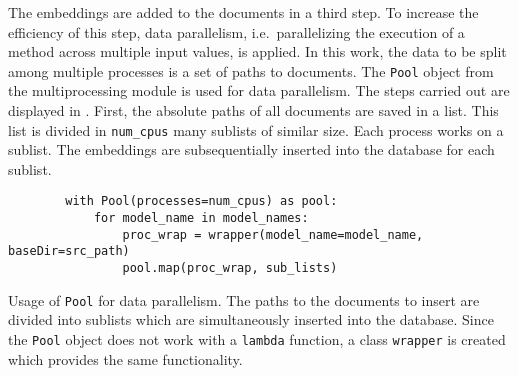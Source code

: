 
The embeddings are added to the documents in a third step.
To increase the efficiency of this step, data parallelism, i.e.\ parallelizing the execution of a method across multiple input values, is applied.
In this work, the data to be split among multiple processes is a set of paths to documents.
The \texttt{Pool} object from the multiprocessing module is used for data parallelism.
The steps carried out are displayed in .
First, the absolute paths of all documents are saved in a list.
This list is divided in \texttt{num\_cpus} many sublists of similar size.
Each process works on a sublist.
The embeddings are subsequentially inserted into the database for each sublist. 

\begin{listing}[htp]
    \begin{verbatim}
        with Pool(processes=num_cpus) as pool:
            for model_name in model_names:
                proc_wrap = wrapper(model_name=model_name, baseDir=src_path)
                pool.map(proc_wrap, sub_lists)
    \end{verbatim}
    \caption[Usage of \texttt{Pool} for data parallelism]
    {Usage of \texttt{Pool} for data parallelism.
    The paths to the documents to insert are divided into sublists which are simultaneously inserted into the database.
    Since the \texttt{Pool} object does not work with a \texttt{lambda} function, 
    a class \texttt{wrapper} is created which provides the same functionality.
    }
    \label{lst:db_Pool_embeddings}
\end{listing}

